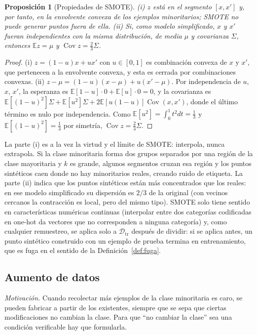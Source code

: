 \documentclass[11pt]{article}
\newtheorem{proposicion}[teorema]{Proposición}
\theoremstyle{definition}
\theoremstyle{remark}
\newcommand{\E}{\mathbb{E}}
\DeclareMathOperator{\Cov}{Cov}
\newcommand{\Dtr}{\mathcal{D}_{\mathrm{tr}}}
\begin{document}
\begin{proposicion}[Propiedades de SMOTE]\label{prop:smote}
\noindent (i) $z$ está en el segmento $[x,x']$ y, por tanto, en la envolvente convexa de los ejemplos minoritarios; SMOTE no puede generar puntos fuera de ella. (ii) Si, como modelo simplificado, $x$ y $x'$ fueran independientes con la misma distribución, de media $\mu$ y covarianza $\Sigma$, entonces $\E z=\mu$ y $\Cov z=\frac23\Sigma$.
\end{proposicion}
\begin{proof}
\noindent (i) $z=(1-u)x+ux'$ con $u\in[0,1]$ es combinación convexa de $x$ y $x'$, que pertenecen a la envolvente convexa, y esta es cerrada por combinaciones convexas. (ii) $z-\mu=(1-u)(x-\mu)+u(x'-\mu)$. Por independencia de $u$, $x$, $x'$, la esperanza es $\E[1-u]\cdot0+\E[u]\cdot0=0$, y la covarianza es $\E[(1-u)^2]\Sigma+\E[u^2]\Sigma+2\E[u(1-u)]\Cov(x,x')$, donde el último término es nulo por independencia. Como $\E[u^2]=\int_0^1t^2dt=\frac13$ y $\E[(1-u)^2]=\frac13$ por simetría, $\Cov z=\frac23\Sigma$.
\end{proof}

\noindent La parte (i) es a la vez la virtud y el límite de SMOTE: interpola, nunca extrapola. Si la clase minoritaria forma dos grupos separados por una región de la clase mayoritaria y $k$ es grande, algunos segmentos cruzan esa región y los puntos sintéticos caen donde no hay minoritarios reales, creando ruido de etiqueta. La parte (ii) indica que los puntos sintéticos están más concentrados que los reales: en ese modelo simplificado su dispersión es $2/3$ de la original (con vecinos cercanos la contracción es local, pero del mismo tipo). SMOTE solo tiene sentido en características numéricas continuas (interpolar entre dos categorías codificadas en one-hot da vectores que no corresponden a ninguna categoría) y, como cualquier remuestreo, se aplica solo a $\Dtr$ después de dividir: si se aplica antes, un punto sintético construido con un ejemplo de prueba termina en entrenamiento, que es fuga en el sentido de la Definición~\ref{def:fuga}.

\subsection{Aumento de datos}\label{sec:aumento}

\noindent \emph{Motivación.} Cuando recolectar más ejemplos de la clase minoritaria es caro, se pueden fabricar a partir de los existentes, siempre que se sepa que ciertas modificaciones no cambian la clase. Para que ``no cambiar la clase'' sea una condición verificable hay que formularla.
\end{document}
